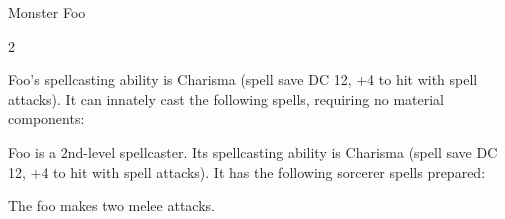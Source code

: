 \documentclass[letterpaper, landscape]{book}
\begin{document}
\begin{DndMonster}[float*=b,width=\textwidth + 8pt]{Monster Foo}
  \begin{multicols}{2}

    \DndMonsterBasics[
        armor-class = {9 (12 with \emph{mage armor})},
        hit-points  = {\DndDice{3d8 + 3}},
        speed       = {30 ft., fly 30 ft.},
      ]

    \DndMonsterAbilityScores[
        str = 12,
        dex = 8,
        con = 13,
        int = 10,
        wis = 14,
        cha = 15,
      ]

    \DndMonsterDetails[
        senses = {darkvision 60 ft., passive Perception 10},
        languages = {Common, Goblin, Undercommon},
        challenge = 1,
      ]
    Foo's spellcasting ability is Charisma (spell save DC 12, +4 to hit with spell attacks). It can innately cast the following spells, requiring no material components:
    \begin{DndMonsterSpells}
    \end{DndMonsterSpells}

    Foo is a 2nd-level spellcaster. Its spellcasting ability is Charisma (spell save DC 12, +4 to hit with spell attacks). It has the following sorcerer spells prepared:
    \begin{DndMonsterSpells}
    \end{DndMonsterSpells}

    The foo makes two melee attacks.


\end{multicols}
\end{DndMonster}
\end{document}
